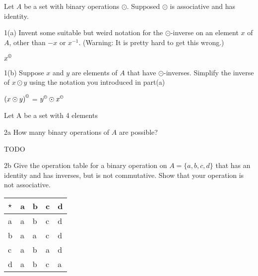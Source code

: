 \begin{question}{1}
Let $A$ be a set with binary operations $\odot$. Supposed $\odot$ is associative and has identity.
\end{question}

\begin{question}{1(a)}
Invent some suitable but weird notation for the $\odot$-inverse on an element $x$ of $A$, other than $-x$ or $x^{-1}$. (Warning: It is pretty hard to get this wrong.)
\end{question}

$x^{\copyright}$

\begin{question}{1(b)}
Suppose $x$ and $y$ are elements of $A$ that have $\odot$-inverses. Simplify the inverse of $x\odot y$ using the notation you introduced in part(a)
\end{question}

${(x\odot y)}^{\copyright}$ = $y^{\copyright}\odot x^{\copyright}$



\begin{question}{2}
Let A be a set with 4 elements
\end{question}

\begin{question}{2a}
How many binary operations of $A$ are possible?
\end{question}

TODO

\begin{question}{2b}
Give the operation table for a binary operation on $A=\{a,b,c,d\}$ that has an identity and has inverses, but is not commutative. Show that your operation is not associative.
\end{question}

\begin{tabular}{l|llll}
$\star$ & a & b & c & d \\
\hline
a       & a & b & c & d \\
b       & a & a & c & d \\
c       & a & b & a & d \\
d       & a & b & c & a
\end{tabular}




